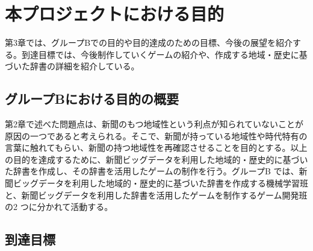 \chapter{本プロジェクトにおける目的}
第3章では、グループBでの目的や目的達成のための目標、今後の展望を紹介する。到達目標では、今後制作していくゲームの紹介や、作成する地域・歴史に基づいた辞書の詳細を紹介している。
\section{グループBにおける目的の概要}
第2章で述べた問題点は、新聞のもつ地域性という利点が知られていないことが原因の一つであると考えられる。そこで、新聞が持っている地域性や時代特有の言葉に触れてもらい、新聞の持つ地域性を再確認させることを目的とする。以上の目的を達成するために、新聞ビッグデータを利用した地域的・歴史的に基づいた辞書を作成し、その辞書を活用したゲームの制作を行う。グループB では、新聞ビッグデータを利用した地域的・歴史的に基づいた辞書を作成する機械学習班と、新聞ビッグデータを利用した辞書を活用したゲームを制作するゲーム開発班の2 つに分かれて活動する。

\section{到達目標}
